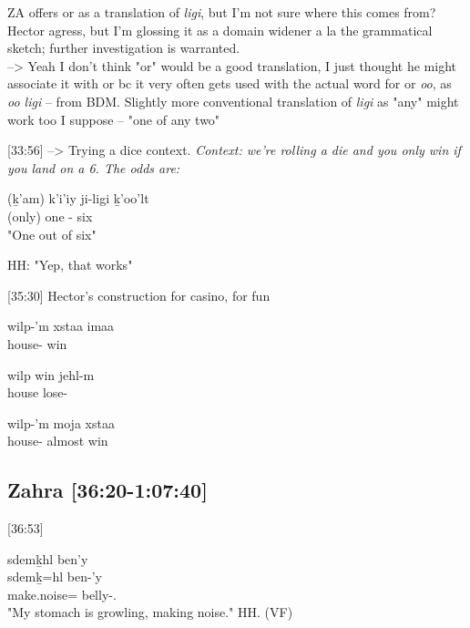 ZA offers or as a translation of \textit{ligi}, but I'm not sure where this comes from? Hector agress, but I'm glossing it as a domain widener a la the grammatical sketch; further investigation is warranted. \\

--> Yeah I don't think "or" would be a good translation, I just thought he might associate it with or bc it very often gets used with the actual word for or \textit{oo}, as \textit{oo ligi} -- from BDM. Slightly more conventional translation of \textit{ligi} as "any" might work too I suppose -- "one of any two"

[33:56] --> Trying a dice context. \textit{Context: we're rolling a die and you only win if you land on a 6. The odds are:}
\begin{exe}
\ex \gll 
(ḵ'am) k'i'iy ji-ligi ḵ'oo'lt\\
(only) one \Irr{}-\Dwid{} six \\
\glt "One out of six"
\end{exe}

HH: "Yep, that works"

[35:30] Hector's construction for casino, for fun
\begin{exe}
\ex \begin{xlist}
\item \gll 
wilp-'m xstaa imaa\\
house-\Attr{} win \Epis{}\\
\item \gll 
wilp win jehl-m \\
house \Comp{} lose-\Attr{}\\
\item \gll 
wilp-'m moja xstaa \\
house-\Attr{} almost win \\
\end{xlist}
\end{exe}

\subsection{Zahra [36:20-1:07:40]}

[36:53]
\begin{exe}
    \ex \glll
    sdemḵhl ben’y \\
    sdemḵ=hl ben-’y \\
    make.noise=\Cn{} belly-\Fsg.\Ii \\
    \glt "My stomach is growling, making noise." \hfill HH.\ElicitationDate{} (VF)
\end{exe}

